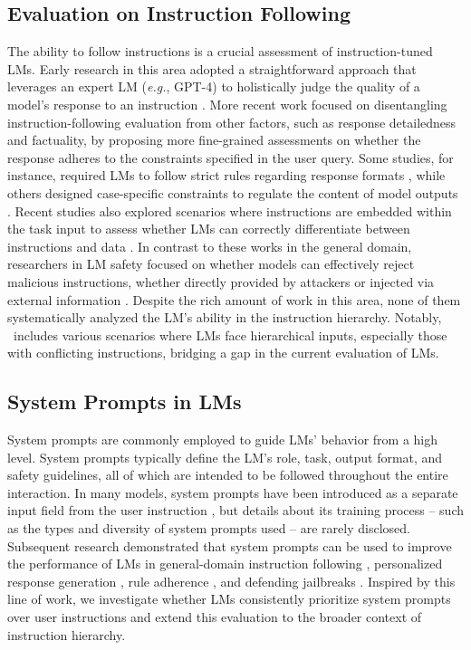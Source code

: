 \subsection{Evaluation on Instruction Following}

The ability to follow instructions is a crucial assessment of instruction-tuned LMs. Early research in this area adopted a straightforward approach that leverages an expert LM (\textit{e.g.}, GPT-4) to holistically judge the quality of a model's response to an instruction \citep{alpacafarm,mtbench}. More recent work focused on disentangling instruction-following evaluation from other factors, such as response detailedness and factuality, by proposing more fine-grained assessments on whether the response adheres to the constraints specified in the user query. Some studies, for instance, required LMs to follow strict rules regarding response formats \citep{ifeval,RuLES,instruction_verbalizer}, while others designed case-specific constraints to regulate the content of model outputs \citep{followbench,infobench,composition-instruction-eval}. Recent studies also explored scenarios where instructions are embedded within the task input to assess whether LMs can correctly differentiate between instructions and data \citep{SEP,BIPIA}. In contrast to these works in the general domain, researchers in LM safety focused on whether models can effectively reject malicious instructions, whether directly provided by attackers \citep{HackAprompt,TensorTrust} or injected via external information \citep{injecagent,Agentdojo}. Despite the rich amount of work in this area, none of them systematically analyzed the LM's ability in the instruction hierarchy. Notably, \benchmark\ includes various scenarios where LMs face hierarchical inputs, especially those with conflicting instructions, bridging a gap in the current evaluation of LMs.

\subsection{System Prompts in LMs}

System prompts \citep{system-prompt} are commonly employed to guide LMs' behavior from a high level. System prompts typically define the LM's role, task, output format, and safety guidelines, all of which are intended to be followed throughout the entire interaction. In many models, system prompts have been introduced as a separate input field from the user instruction \citep{GPT4,llama2,orca}, but details about its training process -- such as the types and diversity of system prompts used -- are rarely disclosed. Subsequent research demonstrated that system prompts can be used to improve the performance of LMs in general-domain instruction following \citep{social-roles-system-prompt}, personalized response generation \citep{align-thousands-preferences}, rule adherence \citep{SoFA}, and defending jailbreaks \citep{system-prompt-in-jailbreak}. Inspired by this line of work, we investigate whether LMs consistently prioritize system prompts over user instructions and extend this evaluation to the broader context of instruction hierarchy.

